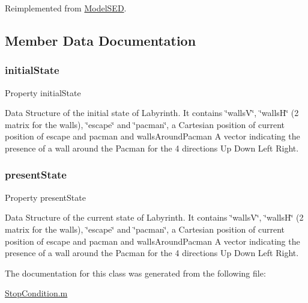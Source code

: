 Reimplemented from \hyperlink{class_model_s_e_d_adb8aaccb857cf5bbec640cd00915459d}{Model\+S\+ED}.



\subsection{Member Data Documentation}
\mbox{\label{class_stop_condition_acd9263acfa96c9138afdf497e55acc24}} 
\subsubsection{\texorpdfstring{initial\+State}{initialState}}
{\footnotesize\ttfamily Property initial\+State}



Data Structure of the initial state of Labyrinth. It contains \char`\"{}walls\+V\char`\"{}, \char`\"{}walls\+H\char`\"{} (2 matrix for the walls), \char`\"{}escape\char`\"{} and \char`\"{}pacman\char`\"{}, a Cartesian position of current position of escape and pacman and \textquotesingle{}walls\+Around\+Pacman\textquotesingle{} A vector indicating the presence of a wall around the Pacman for the 4 directions Up Down Left Right. 

\mbox{\label{class_stop_condition_a9624cc7c421a50fa5086b0ebd0cd5fe3}} 
\subsubsection{\texorpdfstring{present\+State}{presentState}}
{\footnotesize\ttfamily Property present\+State}



Data Structure of the current state of Labyrinth. It contains \char`\"{}walls\+V\char`\"{}, \char`\"{}walls\+H\char`\"{} (2 matrix for the walls), \char`\"{}escape\char`\"{} and \char`\"{}pacman\char`\"{}, a Cartesian position of current position of escape and pacman and \textquotesingle{}walls\+Around\+Pacman\textquotesingle{} A vector indicating the presence of a wall around the Pacman for the 4 directions Up Down Left Right. 



The documentation for this class was generated from the following file\+:\begin{DoxyCompactItemize}
\item 
\hyperlink{_stop_condition_8m}{Stop\+Condition.\+m}\end{DoxyCompactItemize}
